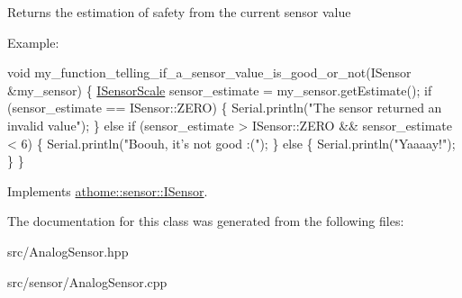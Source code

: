 Returns the estimation of safety from the current sensor value

Example\+:


\begin{DoxyCode}
\textcolor{keywordtype}{void} my\_function\_telling\_if\_a\_sensor\_value\_is\_good\_or\_not(ISensor
&my\_sensor) \{ \mbox{\hyperlink{classathome_1_1sensor_1_1_i_sensor_aa70bc27a4c17c86caf96cca776541ddf}{ISensorScale}} sensor\_estimate = my\_sensor.getEstimate(); \textcolor{keywordflow}{if}
(sensor\_estimate == ISensor::ZERO) \{ Serial.println(\textcolor{stringliteral}{"The sensor returned an}
\textcolor{stringliteral}{invalid value"});
  \}
  \textcolor{keywordflow}{else} \textcolor{keywordflow}{if} (sensor\_estimate > ISensor::ZERO && sensor\_estimate < 6) \{
    Serial.println(\textcolor{stringliteral}{"Boouh, it's not good :("});
  \}
  \textcolor{keywordflow}{else} \{
    Serial.println(\textcolor{stringliteral}{"Yaaaay!"});
  \}
\}
\end{DoxyCode}
 

Implements \mbox{\hyperlink{classathome_1_1sensor_1_1_i_sensor_af86df8538fecfcfc670b4adfbbde6abb}{athome\+::sensor\+::\+I\+Sensor}}.



The documentation for this class was generated from the following files\+:\begin{DoxyCompactItemize}
\item 
src/Analog\+Sensor.\+hpp\item 
src/sensor/Analog\+Sensor.\+cpp\end{DoxyCompactItemize}
